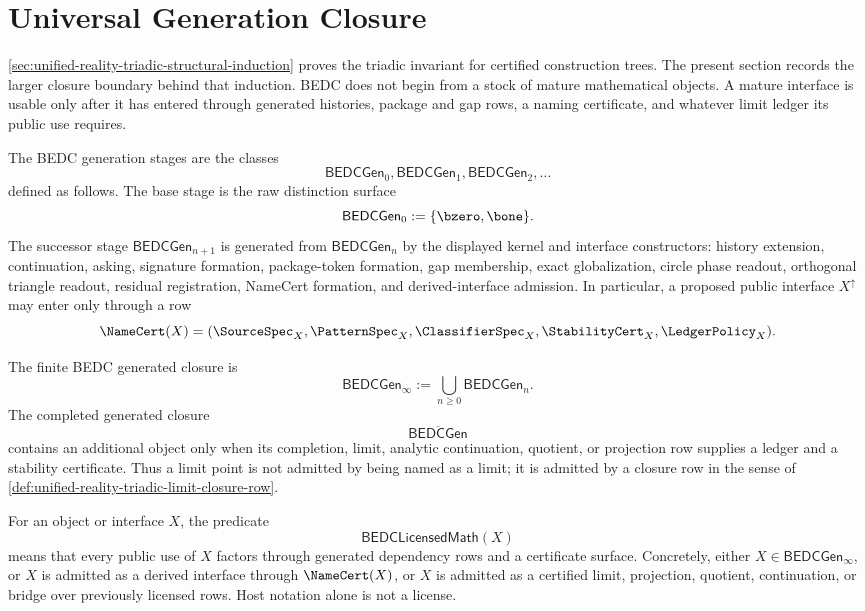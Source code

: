 \section{Universal Generation Closure}
\label{sec:unified-reality-universal-generation-closure}

\autoref{sec:unified-reality-triadic-structural-induction} proves the
triadic invariant for certified construction trees. The present section
records the larger closure boundary behind that induction. BEDC does not
begin from a stock of mature mathematical objects. A mature interface is
usable only after it has entered through generated histories, package and
gap rows, a naming certificate, and whatever limit ledger its public
use requires.

\begin{definition}
\label{def:unified-reality-bedc-generation-stages}
The BEDC generation stages are the classes
$$
\mathsf{BEDCGen}_0,\mathsf{BEDCGen}_1,\mathsf{BEDCGen}_2,\ldots
$$
defined as follows. The base stage is the raw distinction surface
$$
\mathsf{BEDCGen}_0:=\{\bzero,\bone\}.
$$
The successor stage $\mathsf{BEDCGen}_{n+1}$ is generated from
$\mathsf{BEDCGen}_n$ by the displayed kernel and interface constructors:
history extension, continuation, asking, signature formation,
package-token formation, gap membership, exact globalization, circle
phase readout, orthogonal triangle readout, residual registration,
NameCert formation, and derived-interface admission. In particular, a
proposed public interface $X^{\uparrow}$ may enter only through a row
$$
\NameCert(X)
=
(\SourceSpec_X,\PatternSpec_X,\ClassifierSpec_X,\StabilityCert_X,
\LedgerPolicy_X).
$$
\end{definition}

\begin{definition}
\label{def:unified-reality-bedc-generated-closure}
The finite BEDC generated closure is
$$
\mathsf{BEDCGen}_{\infty}
:=
\bigcup_{n\ge0}\mathsf{BEDCGen}_n.
$$
The completed generated closure
$$
\overline{\mathsf{BEDCGen}}
$$
contains an additional object only when its completion, limit, analytic
continuation, quotient, or projection row supplies a ledger and a
stability certificate. Thus a limit point is not admitted by being named
as a limit; it is admitted by a closure row in the sense of
\autoref{def:unified-reality-triadic-limit-closure-row}.
\end{definition}

\begin{definition}
\label{def:unified-reality-bedc-licensed-mathematics}
For an object or interface $X$, the predicate
$$
\mathsf{BEDCLicensedMath}(X)
$$
means that every public use of $X$ factors through generated dependency
rows and a certificate surface. Concretely, either
$X\in\mathsf{BEDCGen}_{\infty}$, or $X$ is admitted as a derived
interface through $\NameCert(X)$, or $X$ is admitted as a certified
limit, projection, quotient, continuation, or bridge over previously
licensed rows. Host notation alone is not a license.
\end{definition}

